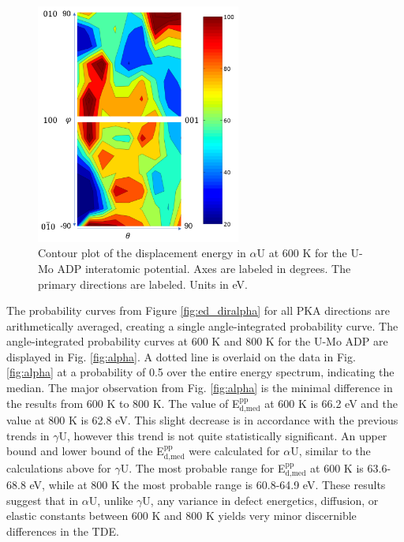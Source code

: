 \documentclass[review]{elsarticle}
\begin{document}
\begin{figure}[h]
 \centering
 \includegraphics[width=0.6\textwidth]{600K_contourA.png} 
 \caption{Contour plot of the displacement energy in $\alpha$U at 600 K for the U-Mo ADP interatomic potential. Axes are labeled in degrees. The primary directions are labeled. Units in eV.}
 \label{fig:600Kcontour}
\end{figure}

\FloatBarrier

The probability curves from Figure \ref{fig:ed_diralpha} for all PKA directions are arithmetically averaged, creating a single angle-integrated probability curve. The angle-integrated probability curves at 600 K and 800 K for the U-Mo ADP are displayed in Fig. \ref{fig:alpha}. A dotted line is overlaid on the data in Fig. \ref{fig:alpha} at a probability of 0.5 over the entire energy spectrum, indicating the median. The major observation from Fig. \ref{fig:alpha} is the minimal difference in the results from 600 K to 800 K. The value of E$^{\textrm{pp}}_{\textrm{d,med}}$ at 600 K is 66.2 eV and the value at 800 K is 62.8 eV. This slight decrease is in accordance with the previous trends in $\gamma$U, however this trend is not quite statistically significant. An upper bound and lower bound of the E$^{\textrm{pp}}_{\textrm{d,med}}$ were calculated for $\alpha$U, similar to the calculations above for $\gamma$U. The most probable range for E$^{\textrm{pp}}_{\textrm{d,med}}$ at 600 K is 63.6-68.8 eV, while at 800 K the most probable range is 60.8-64.9 eV. These results suggest that in $\alpha$U, unlike $\gamma$U, any variance in defect energetics, diffusion, or elastic constants between 600 K and 800 K yields very minor discernible differences in the TDE.
\end{document}
